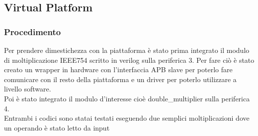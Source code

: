 \documentclass[]{IEEEtran}
\begin{document}
\subsection{Virtual Platform}

\subsubsection{Procedimento}
Per prendere dimestichezza con la piattaforma è stato prima integrato il modulo di moltiplicazione IEEE754 scritto in verilog sulla periferica 3. Per fare ciò è stato creato un wrapper in hardware con l'interfaccia APB slave per poterlo fare comunicare con il resto della piattaforma e un driver per poterlo utilizzare a livello software.
\\Poi è stato integrato il modulo d'interesse cioè double\_multiplier sulla periferica 4.
\\Entrambi i codici sono statai testati eseguendo due semplici moltiplicazioni dove un operando è stato letto da input
\end{document}
